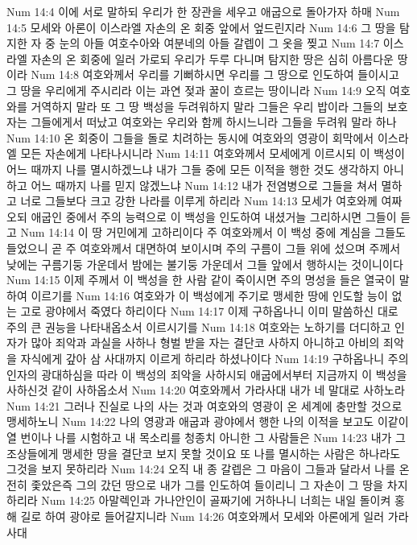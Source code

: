 Num 14:4  이에 서로 말하되 우리가 한 장관을 세우고 애굽으로 돌아가자 하매
Num 14:5  모세와 아론이 이스라엘 자손의 온 회중 앞에서 엎드린지라
Num 14:6  그 땅을 탐지한 자 중 눈의 아들 여호수아와 여분네의 아들 갈렙이 그 옷을 찢고
Num 14:7  이스라엘 자손의 온 회중에 일러 가로되 우리가 두루 다니며 탐지한 땅은 심히 아름다운 땅이라
Num 14:8  여호와께서 우리를 기뻐하시면 우리를 그 땅으로 인도하여 들이시고 그 땅을 우리에게 주시리라 이는 과연 젖과 꿀이 흐르는 땅이니라
Num 14:9  오직 여호와를 거역하지 말라 또 그 땅 백성을 두려워하지 말라 그들은 우리 밥이라 그들의 보호자는 그들에게서 떠났고 여호와는 우리와 함께 하시느니라 그들을 두려워 말라 하나
Num 14:10  온 회중이 그들을 돌로 치려하는 동시에 여호와의 영광이 회막에서 이스라엘 모든 자손에게 나타나시니라
Num 14:11  여호와께서 모세에게 이르시되 이 백성이 어느 때까지 나를 멸시하겠느냐 내가 그들 중에 모든 이적을 행한 것도 생각하지 아니하고 어느 때까지 나를 믿지 않겠느냐
Num 14:12  내가 전염병으로 그들을 쳐서 멸하고 너로 그들보다 크고 강한 나라를 이루게 하리라
Num 14:13  모세가 여호와께 여짜오되 애굽인 중에서 주의 능력으로 이 백성을 인도하여 내셨거늘 그리하시면 그들이 듣고
Num 14:14  이 땅 거민에게 고하리이다 주 여호와께서 이 백성 중에 계심을 그들도 들었으니 곧 주 여호와께서 대면하여 보이시며 주의 구름이 그들 위에 섰으며 주께서 낮에는 구름기둥 가운데서 밤에는 불기둥 가운데서 그들 앞에서 행하시는 것이니이다
Num 14:15  이제 주께서 이 백성을 한 사람 같이 죽이시면 주의 명성을 들은 열국이 말하여 이르기를
Num 14:16  여호와가 이 백성에게 주기로 맹세한 땅에 인도할 능이 없는 고로 광야에서 죽였다 하리이다
Num 14:17  이제 구하옵나니 이미 말씀하신 대로 주의 큰 권능을 나타내옵소서 이르시기를
Num 14:18  여호와는 노하기를 더디하고 인자가 많아 죄악과 과실을 사하나 형벌 받을 자는 결단코 사하지 아니하고 아비의 죄악을 자식에게 갚아 삼 사대까지 이르게 하리라 하셨나이다
Num 14:19  구하옵나니 주의 인자의 광대하심을 따라 이 백성의 죄악을 사하시되 애굽에서부터 지금까지 이 백성을 사하신것 같이 사하옵소서
Num 14:20  여호와께서 가라사대 내가 네 말대로 사하노라
Num 14:21  그러나 진실로 나의 사는 것과 여호와의 영광이 온 세계에 충만할 것으로 맹세하노니
Num 14:22  나의 영광과 애굽과 광야에서 행한 나의 이적을 보고도 이같이 열 번이나 나를 시험하고 내 목소리를 청종치 아니한 그 사람들은
Num 14:23  내가 그 조상들에게 맹세한 땅을 결단코 보지 못할 것이요 또 나를 멸시하는 사람은 하나라도 그것을 보지 못하리라
Num 14:24  오직 내 종 갈렙은 그 마음이 그들과 달라서 나를 온전히 좇았은즉 그의 갔던 땅으로 내가 그를 인도하여 들이리니 그 자손이 그 땅을 차지하리라
Num 14:25  아말렉인과 가나안인이 골짜기에 거하나니 너희는 내일 돌이켜 홍해 길로 하여 광야로 들어갈지니라
Num 14:26  여호와께서 모세와 아론에게 일러 가라사대

